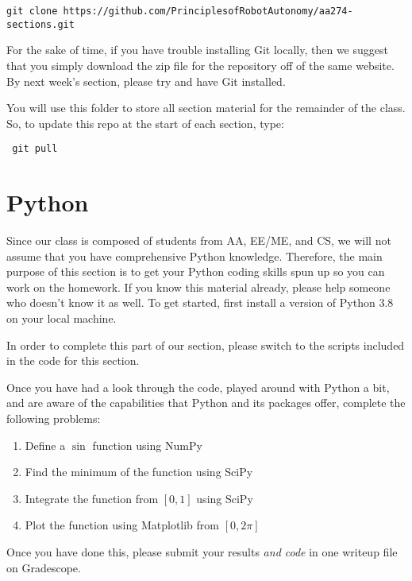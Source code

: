 \documentclass{article}
\begin{document}
 \begin{lstlisting}[escapechar=|]
 git clone https://github.com/PrinciplesofRobotAutonomy/aa274-sections.git
\end{lstlisting}
For the sake of time, if you have trouble installing Git locally, then we suggest that you simply download the zip file for the repository off of the same website. By next week's section, please try and have Git installed.

You will use this folder to store all section material for the remainder of the class. So, to update this repo at the start of each section, type: 

 \begin{lstlisting}
 git pull
\end{lstlisting}


\section{Python}
Since our class is composed of students from AA, EE/ME, and CS, we will not assume that you have comprehensive Python knowledge. Therefore, the main purpose of this section is to get your Python coding skills spun up so you can work on the homework. If you know this material already, please help someone who doesn't know it as well. To get started, first install a version of Python 3.8 on your local machine. 

In order to complete this part of our section, please switch to the scripts included in the code for this section.


Once you have had a look through the code, played around with Python a bit, and are aware of the capabilities that Python and its packages offer, complete the following problems:
{\bf
\begin{enumerate}
\item Define a $\sin$ function using NumPy
\item Find the minimum of the function using SciPy
\item Integrate the function from $[0, 1]$ using SciPy
\item Plot the function using Matplotlib from $[0, 2\pi]$
\end{enumerate}
}
Once you have done this, please submit your results \textit{and code} in one writeup file on Gradescope.
\end{document}
